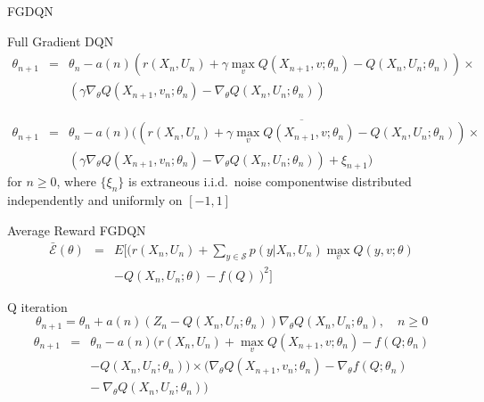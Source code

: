 \documentclass{beamer}
\begin{document}
\begin{frame}{FGDQN}

\begin{block}{Full Gradient DQN}
\begin{eqnarray}
\theta_{n+1} &=& \theta_n - a(n)\left(r(X_n,U_n) + \gamma\max_v Q(X_{n+1}, v; \theta_n) - Q(X_n, U_n;\theta_n)\right)\times \nonumber \\
&& \left(\gamma\nabla_\theta Q(X_{n+1}, v_n; \theta_n) - \nabla_\theta Q(X_n, U_n; \theta_n)\right)\nonumber
\end{eqnarray}


\begin{eqnarray}
\theta_{n+1} &=& \theta_n - a(n)\Bigg(\overline{(r(X_n,U_n) + \gamma\max_v Q(X_{n+1}, v; \theta_n) - Q(X_n, U_n;\theta_n))}\times \nonumber \\
&& \left(\gamma\nabla_\theta Q(X_{n+1}, v_n; \theta_n) - \nabla_\theta Q(X_n, U_n; \theta_n)\right)  + \xi_{n+1}\Bigg)\nonumber
\end{eqnarray}
for $n \geq 0$, where $\{\xi_n\}$  is extraneous i.i.d.\  noise componentwise distributed independently and uniformly on $[-1,1]$
\end{block}

\end{frame}

\begin{frame}{Average Reward FGDQN}
    \begin{eqnarray}
    \bar{\mathcal{E}}(\theta) &=& E\Big[\Big(r(X_n, U_n) + \sum_{y\in\mathcal{S}} p(y|X_n,U_n)
\max_v Q(y,v; \theta) \nonumber \\&& -Q(X_n,U_n;\theta) - f(Q)\ \Big)^2\Big]\nonumber \label{Ebar}
    \end{eqnarray}
\begin{block}{Q iteration}
\begin{equation}
\theta_{n+1} = \theta_n +a(n)(Z_n - Q(X_n, U_n; \theta_n))\nabla_\theta Q(X_n, U_n; \theta_n), \quad n \geq 0 \nonumber
\end{equation}
\begin{eqnarray}
\label{eqn:fgdqnavg}
\theta_{n+1} &=& \theta_n - a(n)\Big(r(X_n,U_n) +\max_v Q(X_{n+1}, v; \theta_n) -f(Q;\theta_n) \nonumber \\
&&- Q(X_n, U_n;\theta_n)\Big)\times  \Big(\nabla_\theta Q(X_{n+1}, v_n; \theta_n) - \nabla_\theta f(Q;\theta_n) \nonumber \\
&&- \ \nabla_\theta Q(X_n, U_n; \theta_n)\Big)\nonumber \\
& \ \nonumber\label{Q-update0}
\end{eqnarray}

\end{block}

\end{frame}
\end{document}
